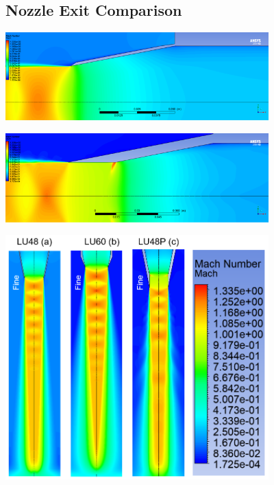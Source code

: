 \documentclass[12pt]{article} %
\begin{document}
\subsection{Nozzle Exit Comparison}
\begin{center}
    \includegraphics[width=4in]{Mach_A.png}
    \label{fig:mach_A}
\end{center}

\begin{center}
    \includegraphics[width=4in]{Mach_C_Fine.png}
    \label{fig:mach_C}
\end{center}

\begin{center}
    \includegraphics[width=4in]{NozzleCompare_Mach.PNG}
    \label{fig:NozzleComparison}
\end{center}
\end{document}
